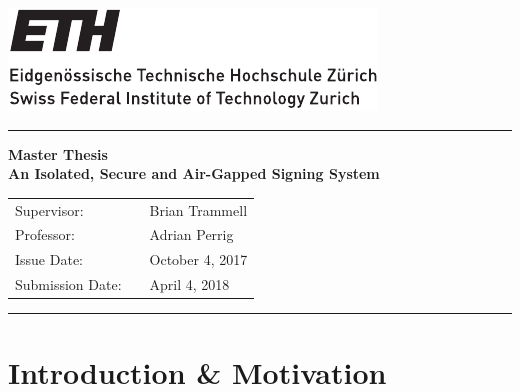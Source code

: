 \documentclass[a4paper, 11pt]{article}
\begin{document}
\includegraphics[scale=1]{ETHlogo_13.pdf}
\vspace{10pt}
\hrule
\vspace{10pt}

\begin{center}
    {\LARGE
    \textbf{Master Thesis}\\
    \vspace{5pt}
    \textbf{\Huge{An Isolated, Secure and Air-Gapped Signing System}}}
 
    \vspace{15pt}
    \begin{tabular}{lll}
    Supervisor: & & Brian Trammell \\
    Professor: & & Adrian Perrig \\
    Issue Date: & & October 4, 2017 \\
    Submission Date: & & April 4, 2018
    \end{tabular}

   
\end{center}

\vspace{10pt}
\hrule

\section{Introduction \& Motivation}
\end{document}
